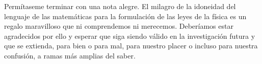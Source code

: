 \documentclass[a4paper, 12pt]{article}
\begin{document}
Permítaseme terminar con una nota alegre. El milagro de la idoneidad del lenguaje de las matemáticas para la formulación de las leyes de la física es un regalo maravilloso que ni comprendemos ni merecemos. Deberíamos estar agradecidos por ello y esperar que siga siendo válido en la investigación futura y que se extienda, para bien o para mal, para nuestro placer o incluso para nuestra confusión, a ramas más amplias del saber.
\end{document}
